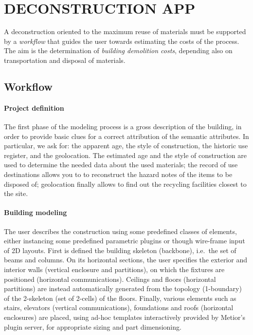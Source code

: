 \section{\uppercase{Deconstruction App}}
\label{sec:application}

\noindent
A deconstruction oriented to the maximum reuse of materials must be supported by a \emph{workflow} that guides the user towards estimating the costs of the process. The aim is the determination of  \emph{building demolition costs}, depending also on transportation  and disposal of materials.

\vspace{-3mm}\subsection{Workflow}\vspace{-3mm}

\paragraph{Project definition} 

The first phase of the modeling process is a gross description of the building, in order to provide basic clues for a correct attribution of the semantic attributes.
In particular, we ask for: the apparent age, the style of construction, the historic use register, and the geolocation.
The estimated age and the style of construction are used to determine the needed data about the used materials; the record of use destinations allows you to to reconstruct the hazard notes of the items to be disposed of; geolocation finally allows to find out the recycling facilities closest to the site.

\vspace{-2mm}\paragraph{Building modeling} 
The user describes the construction using some predefined classes of elements, either instancing some  predefined parametric plugins or though wire-frame input of 2D layouts. 
First is defined the building skeleton (backbone), i.e.~the set of beams and columns.
On its horizontal sections, the user specifies the exterior and interior walls (vertical enclosure and partitions), on which the fixtures are positioned (horizontal communications).
Ceilings and floors (horizontal partitions) are instead automatically generated from the topology (1-boundary) of the 2-skeleton (set of 2-cells) of the floors.
Finally, various elements such as stairs, elevators (vertical communications), foundations and roofs (horizontal enclosures) are placed, using ad-hoc templates interactively provided by Metior's plugin server, for appropriate sizing and part dimensioning.

